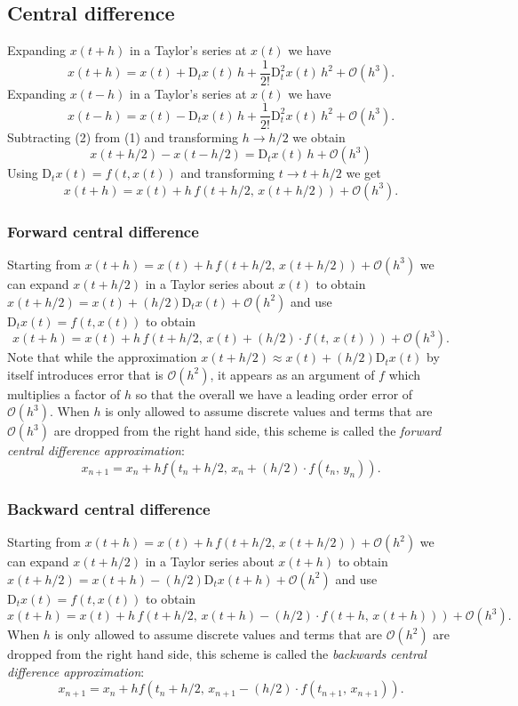 \documentclass[11pt]{article}
\begin{document}
\subsection*{Central difference}
\label{sec:org1386d78}
Expanding \(x(t + h)\) in a Taylor's series at \(x (t)\) we have
\[
x(t + h) = x(t) + \mathrm{D}_t x(t) \, h + \frac{1}{2!} \mathrm{D}_t^{2} x(t) \, h^{2} + \mathcal{O} (h^{3}). \tag{1}
\]
Expanding \(x(t - h)\) in a Taylor's series at \(x (t)\) we have
\[
x(t- h) = x(t) - \mathrm{D}_t x(t) \, h + \frac{1}{2!} \mathrm{D}_t^{2} x(t) \, h^{2} + \mathcal{O} (h^{3}). \tag{2}
\]
Subtracting (2) from (1) and transforming \(h \to h / 2\) we obtain
\[
x(t + h / 2) - x(t- h/2) = \mathrm{D}_t x(t) \, h + \mathcal{O} (h^{3})
\]
Using \(\mathrm{D}_t x(t) = f(t, x(t))\) and transforming \(t \to t + h/2\) we get
\[
\boxed{
x(t+h) = x(t) + h \, f(t + h/2,\,x(t + h/2))  + \mathcal{O} (h^{3}).
}
\]
\subsubsection{Forward central difference}
\label{sec:org353e83b}
Starting from \(x(t+h) = x(t) + h \, f(t + h/2,\,x(t + h/2))  + \mathcal{O} (h^{3})\) we can expand \(x(t + h/2)\) in a Taylor series about \(x(t)\) to obtain \(x(t + h/2) = x(t) + (h/2) \mathrm{D}_t x(t) + \mathcal{O}(h^2)\) and use \(\mathrm{D}_t x(t) = f(t, x(t))\) to obtain
\[
\boxed{
x(t+h) = x(t) + h \, f(t + h/2,\,x(t) + (h/2) \cdot f(t,\,x(t)))  + \mathcal{O} (h^{3}).
}
\]
Note that while the approximation \(x(t + h/2) \approx x(t) + (h/2) \mathrm{D}_t x(t)\) by itself introduces error that is \(\mathcal{O} (h^2)\), it appears as an argument of \(f\) which multiplies a factor of \(h\) so that the overall we have a leading order error of \(\mathcal{O} (h^3)\). When \(h\) is only allowed to assume discrete values and terms that are \(\mathcal{O} (h^{3})\) are dropped from the right hand side, this scheme is called the \emph{forward central difference approximation}:
\[
\boxed{
x_{n+1} = x_{n} + h f(t_n + h/2,\, x_n + (h/2) \cdot f(t_n,\,y_n)).
}
\]
\subsubsection{Backward central difference}
\label{sec:orgdc9f7b1}
Starting from \(x(t+h) = x(t) + h \, f(t + h/2,\,x(t + h/2))  + \mathcal{O} (h^{2})\) we can expand \(x(t + h/2)\) in a Taylor series about \(x(t + h)\) to obtain \(x(t + h/2) = x(t+h) - (h/2) \mathrm{D}_t x(t+h) + \mathcal{O}(h^2)\) and use \(\mathrm{D}_t x(t) = f(t, x(t))\) to obtain
\[
\boxed{
x(t+h) = x(t) + h \, f(t + h/2,\,x(t+h) - (h/2) \cdot f(t+h,\,x(t+h)))  + \mathcal{O} (h^{3}).
}
\]
When \(h\) is only allowed to assume discrete values and terms that are \(\mathcal{O} (h^{2})\) are dropped from the right hand side, this scheme is called the \emph{backwards central difference approximation}:
\[
\boxed{
x_{n+1} = x_{n} + h f(t_n + h/2,\, x_{n+1} - (h/2) \cdot f(t_{n+1},\,x_{n+1})).
}
\]
\end{document}
